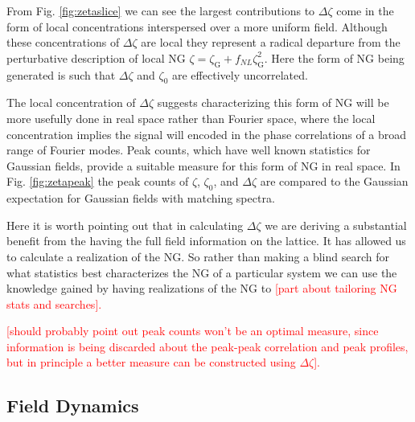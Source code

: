 From Fig. \ref{fig:zetaslice} we can see the largest contributions to $\Delta\zeta$ come in the form of local concentrations interspersed over a more uniform field. Although these concentrations of $\Delta\zeta$ are local they represent a radical departure from the perturbative description of local NG $\zeta = \zeta_\mathrm{G} + f_{NL}\zeta^2_\mathrm{G}$. Here the form of NG being generated is such that $\Delta\zeta$ and $\zeta_0$ are effectively uncorrelated.

The local concentration of $\Delta\zeta$ suggests characterizing this form of NG will be more usefully done in real space rather than Fourier space, where the local concentration implies the signal will encoded in the phase correlations of a broad range of Fourier modes. Peak counts, which have well known statistics for Gaussian fields, provide a suitable measure for this form of NG in real space. In Fig. \ref{fig:zetapeak} the peak counts of $\zeta$, $\zeta_0$, and $\Delta\zeta$ are compared to the Gaussian expectation for Gaussian fields with matching spectra. 

Here it is worth pointing out that in calculating $\Delta\zeta$ we are deriving a substantial benefit from the having the full field information on the lattice. It has allowed us to calculate a realization of the NG. So rather than making a blind search for what statistics best characterizes the NG of a particular system we can use the knowledge gained by having realizations of the NG to \textcolor{red}{[part about tailoring NG stats and searches].}

\textcolor{red}{[should probably point out peak counts won't be an optimal measure, since information is being discarded about the peak-peak correlation and peak profiles, but in principle a better measure can be constructed using $\Delta\zeta$].}


\Fzetaslice
\Fzetapeak

\subsection{Field Dynamics} \label{sec:field dynamics}

